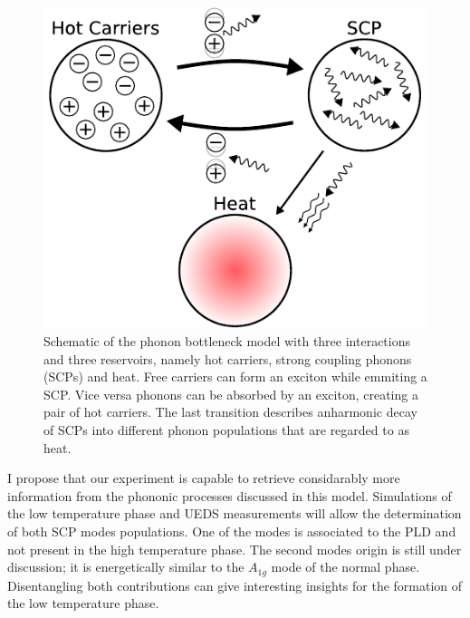 \begin{figure}[!t]
	\begin{minipage}{0.5\columnwidth}
		\includegraphics[width=\columnwidth]{figs/phonon_bottleneck.pdf}
	\end{minipage}
	\hspace{0.04\columnwidth}
	\begin{minipage}{0.45\columnwidth}
		\caption{Schematic of the phonon bottleneck model with three interactions and three reservoirs, namely hot carriers, strong coupling phonons (SCPs) and heat. Free carriers can form an exciton while emmiting a SCP. Vice versa phonons can be absorbed by an exciton, creating a pair of hot carriers. The last transition describes anharmonic decay of SCPs into different phonon populations that are regarded to as heat.}
		\label{fig:model}
	\end{minipage}
\end{figure}

I propose that our experiment is capable to retrieve considarably more information from the phononic processes discussed in this model.
Simulations of the low temperature phase and \ac{UEDS} measurements will allow the determination of both \ac{SCP} modes populations.
One of the modes is associated to the \ac{PLD} and not present in the high temperature phase.
The second modes origin is still under discussion; it is energetically similar to the $A_{1g}$ mode of the normal phase\cite{holy1977}.
Disentangling both contributions can give interesting insights for the formation of the low temperature phase.

